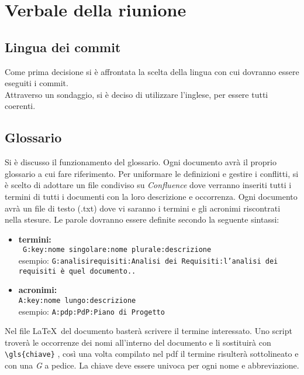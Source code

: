 \section{Verbale della riunione}
\subsection{Lingua dei commit}
Come prima decisione si è affrontata la scelta della lingua con cui dovranno essere eseguiti i commit. \\Attraverso un sondaggio, si è deciso di utilizzare l'inglese, per essere tutti coerenti.

\subsection{Glossario}
Si è discusso il funzionamento del glossario. Ogni documento avrà il proprio glossario a cui fare riferimento. 
Per uniformare le definizioni e gestire i conflitti, si è scelto di adottare un file condiviso su \textit{Confluence} dove verranno inseriti tutti i termini di tutti i documenti con la loro descrizione e occorrenza.
Ogni documento avrà un file di testo (.txt) dove vi saranno i termini e gli acronimi riscontrati nella stesure. Le parole dovranno essere definite secondo la seguente sintassi:
\begin{itemize}
\item \textbf{termini:}
	\\ \texttt{ G:key:nome singolare:nome plurale:descrizione}
	\\ esempio: \texttt{G:analisirequisiti:Analisi dei Requisiti:l'analisi dei requisiti è quel documento..}
\item \textbf{acronimi:}
	\\ 	\texttt{A:key:nome lungo:descrizione} 
	\\ esempio: \texttt{A:pdp:PdP:Piano di Progetto}
\end{itemize}
Nel file \LaTeX\ del documento basterà scrivere il termine interessato. Uno script troverà le occorrenze dei nomi all'interno del documento e li sostituirà con \texttt{\textbackslash gls\{chiave\}} , così una volta compilato nel pdf il termine risulterà sottolineato e con una \textit{G} a pedice.
La chiave deve essere univoca per ogni nome e abbreviazione.

